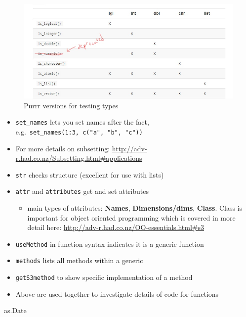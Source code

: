 \documentclass[]{book}
\newenvironment{Shaded}{\begin{snugshade}}{\end{snugshade}}
\newcommand{\NormalTok}[1]{#1}
\providecommand{\tightlist}{%
  \setlength{\itemsep}{0pt}\setlength{\parskip}{0pt}}
\theoremstyle{definition}
\theoremstyle{definition}
\theoremstyle{definition}
\theoremstyle{remark}
\begin{document}
\begin{figure}
\centering
\includegraphics{test-type.jpg}
\caption{Purrr versions for testing types}
\end{figure}

\begin{itemize}
\tightlist
\item
  \texttt{set\_names} lets you set names after the fact,
  e.g.~\texttt{set\_names(1:3,\ c("a",\ "b",\ "c"))}
\item
  For more details on subsetting:
  \url{http://adv-r.had.co.nz/Subsetting.html\#applications}
\item
  \texttt{str} checks structure (excellent for use with lists)
\item
  \texttt{attr} and \texttt{attributes} get and set attributes

  \begin{itemize}
  \tightlist
  \item
    main types of attributes: \textbf{Names}, \textbf{Dimensions/dims},
    \textbf{Class}. Class is important for object oriented programming
    which is covered in more detail here:
    \url{http://adv-r.had.co.nz/OO-essentials.html\#s3}
  \end{itemize}
\item
  \texttt{useMethod} in function syntax indicates it is a generic
  function
\item
  \texttt{methods} lists all methods within a generic
\item
  \texttt{getS3method} to show specific implementation of a method
\item
  Above are used together to investigate details of code for functions
\end{itemize}

\begin{Shaded}
\begin{Highlighting}[]
\NormalTok{as.Date}
\end{Highlighting}
\end{Shaded}
\end{document}
